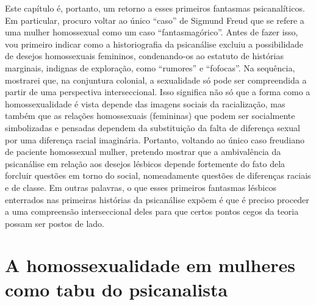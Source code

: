 Este capítulo é, portanto, um retorno a esses primeiros fantasmas
psicanalíticos. Em particular, procuro voltar ao único ``caso'' de
Sigmund Freud que se refere a uma mulher homossexual como um caso
``fantasmagórico''. Antes de fazer isso, vou primeiro indicar como a
historiografia da psicanálise excluiu a possibilidade de desejos
homossexuais femininos, condenando-os ao estatuto de histórias
marginais, indignas de exploração, como ``rumores'' e ``fofocas''. Na
sequência, mostrarei que, na conjuntura colonial, a sexualidade só pode
ser compreendida a partir de uma perspectiva interseccional. Isso
significa não só que a forma como a homossexualidade é vista depende das
imagens sociais da racialização, mas também que as relações homossexuais
(femininas) que podem ser socialmente simbolizadas e pensadas dependem
da substituição da falta de diferença sexual por uma diferença racial
imaginária. Portanto, voltando ao único caso freudiano de paciente
homossexual mulher, pretendo mostrar que a ambivalência da psicanálise
em relação aos desejos lésbicos depende fortemente do fato dela forcluir
questões em torno do social, nomeadamente questões de diferenças raciais
e de classe. Em outras palavras, o que esses primeiros fantasmas
lésbicos enterrados nas primeiras histórias da psicanálise expõem é que
é preciso proceder a uma compreensão interseccional deles para que
certos pontos cegos da teoria possam ser postos de lado.

\section{A homossexualidade em mulheres como tabu do psicanalista}

